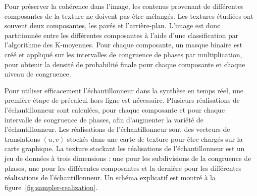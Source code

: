 \bigskip

Pour préserver la cohérence dans l'image, les contenus provenant de différentes composantes de la texture ne doivent pas être mélangés. Les textures étudiées ont souvent deux composantes, les pavés et l'arrière-plan. L'image est donc partitionnée entre les différentes composantes à l'aide d'une classification par l'algorithme des K-moyennes. Pour chaque composante, un masque binaire est créé et appliqué sur les intervalles de congruence de phases par multiplication, pour obtenir la densité de probabilité finale pour chaque composante et chaque niveau de congruence.

\bigskip

Pour utiliser efficacement l'échantillonneur dans la synthèse en temps réel, une première étape de précalcul hors-ligne est nécessaire. Plusieurs réalisations de l'échantillonneur sont calculées, pour chaque composante et pour chaque intervalle de congruence de phases, afin d'augmenter la variété de l'échantillonneur. Les réalisations de l'échantillonneur sont des vecteurs de translations $(u, v)$ stockés dans une carte de texture pour être chargés sur la carte graphique. La texture stockant les réalisations de l'échantillonneur est un jeu de données à trois dimensions : une pour les subdivisions de la congruence de phases, une pour les différentes composantes et la dernière pour les différentes réalisations de l'échantillonneur. Un schéma explicatif est montré à la figure~\ref{fig:sampler-realization}.

\bigskip

